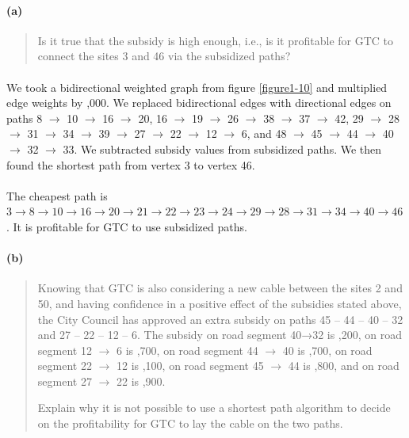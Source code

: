 \paragraph{(a)}
\begin{quote}
Is it true that the subsidy is high enough, i.e., is it profitable for GTC to connect the sites 3 and 46 via the subsidized paths?
\end{quote}

\paragraph{}
We took a bidirectional weighted graph from figure \ref{figure1-10} and multiplied edge weights by ,000. We replaced bidirectional edges with directional edges on paths 8 $\rightarrow$ 10 $\rightarrow$ 16 $\rightarrow$ 20, 16 $\rightarrow$ 19 $\rightarrow$ 26 $\rightarrow$ 38 $\rightarrow$ 37 $\rightarrow$ 42, 29 $\rightarrow$ 28 $\rightarrow$ 31 $\rightarrow$ 34 $\rightarrow$ 39 $\rightarrow$ 27 $\rightarrow$ 22 $\rightarrow$ 12 $\rightarrow$ 6, and 48 $\rightarrow$ 45  $\rightarrow$ 44 $\rightarrow$ 40 $\rightarrow$ 32 $\rightarrow$ 33. We subtracted subsidy values from subsidized paths. We then found the shortest path from vertex 3 to vertex 46.

\paragraph{}
The cheapest path is $ 3 \rightarrow 8 \rightarrow 10 \rightarrow 16 \rightarrow 20 \rightarrow 21 \rightarrow 22 \rightarrow 23 \rightarrow 24 \rightarrow 29 \rightarrow 28 \rightarrow 31 \rightarrow 34 \rightarrow 40 \rightarrow 46 $. It is profitable for GTC to use subsidized paths.

\paragraph{(b)}
\begin{quote}
Knowing that GTC is also considering a new cable between the sites 2 and 50, and having confidence in a positive effect of the subsidies stated above, the City Council has approved an extra subsidy on paths 45 – 44 – 40 – 32 and 27 – 22 – 12 – 6. The subsidy on road segment 40→32 is ,200, on road segment 12 $\rightarrow$ 6 is ,700, on road segment 44 $\rightarrow$ 40 is ,700, on road segment 22 $\rightarrow$ 12 is ,100, on road segment 45 $\rightarrow$ 44 is ,800, and on road segment 27 $\rightarrow$ 22 is ,900.

Explain why it is not possible to use a shortest path algorithm to decide on the profitability for GTC to lay the cable on the two paths.
\end{quote}

